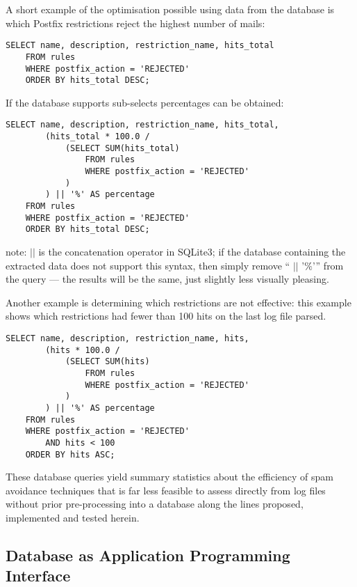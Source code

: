 \documentclass[a4paper,12pt,draft]{article}
\begin{document}
A short example of the optimisation possible using data from the database
is which Postfix restrictions reject the highest number of mails:

\begin{verbatim}
SELECT name, description, restriction_name, hits_total
    FROM rules
    WHERE postfix_action = 'REJECTED'
    ORDER BY hits_total DESC;
\end{verbatim}

If the database supports sub-selects percentages can be
obtained:

\begin{verbatim}
SELECT name, description, restriction_name, hits_total,
        (hits_total * 100.0 /
            (SELECT SUM(hits_total)
                FROM rules
                WHERE postfix_action = 'REJECTED'
            )
        ) || '%' AS percentage
    FROM rules
    WHERE postfix_action = 'REJECTED'
    ORDER BY hits_total DESC;
\end{verbatim}

\SQL{} note: $||$ is the concatenation operator in SQLite3; if the database
containing the extracted data does not support this syntax, then simply
remove `` $||$ '$\%$'\hspace{1ex}'' from the query --- the results will be
the same, just slightly less visually pleasing.

Another example is determining which restrictions are not effective: this
example shows which restrictions had fewer than 100 hits on the last log
file parsed.

\begin{verbatim}
SELECT name, description, restriction_name, hits,
        (hits * 100.0 /
            (SELECT SUM(hits)
                FROM rules
                WHERE postfix_action = 'REJECTED'
            )
        ) || '%' AS percentage
    FROM rules
    WHERE postfix_action = 'REJECTED'
        AND hits < 100
    ORDER BY hits ASC;
\end{verbatim}

These database queries yield summary statistics about the efficiency of
spam avoidance techniques that is far less feasible to assess directly from
log files without prior pre-processing into a database along the lines
proposed, implemented and tested herein.

\subsection{Database as Application Programming Interface}
\end{document}

